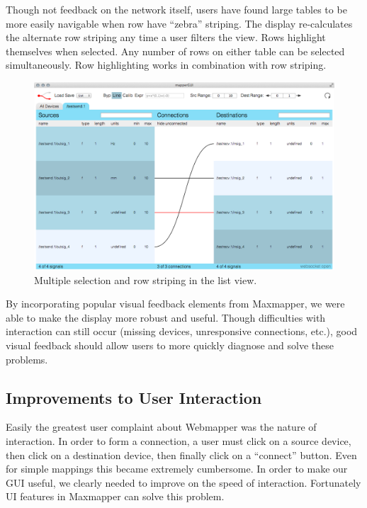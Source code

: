 Though not feedback on the network itself, users have found large tables to be more easily navigable when row have ``zebra'' striping. The display re-calculates the alternate row striping any time a user filters the view. Rows highlight themselves when selected. Any number of rows on either table can be selected simultaneously. Row highlighting works in combination with row striping. 

\begin{figure}[!h]
	\centering
	\includegraphics[width=1\textwidth]{figures/row_striping}
	\caption{Multiple selection and row striping in the list view.}
	\label{fig:row_striping}
\end{figure}

By incorporating popular visual feedback elements from Maxmapper, we were able to make the display more robust and useful. Though difficulties with interaction can still occur (missing devices, unresponsive connections, etc.), good visual feedback should allow users to more quickly diagnose and solve these problems.


	\subsection{Improvements to User Interaction} %
	\label{sub:improvements_to_user_interaction}

Easily the greatest user complaint about Webmapper was the nature of interaction. In order to form a connection, a user must click on a source device, then click on a destination device, then finally click on a ``connect'' button. Even for simple mappings this became extremely cumbersome. In order to make our GUI useful, we clearly needed to improve on the speed of interaction. Fortunately UI features in Maxmapper can solve this problem.
	

